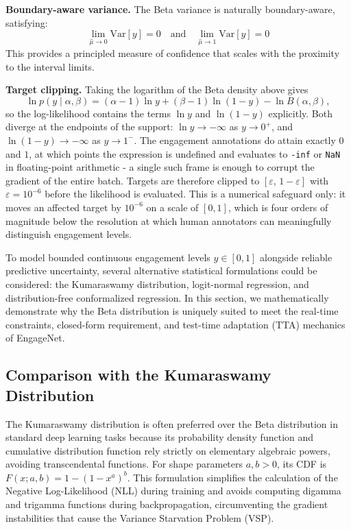 \documentclass[10pt,a4paper,twocolumn]{article}
\begin{document}
	\textbf{Boundary-aware variance.} The Beta variance is naturally boundary-aware, satisfying: 
	$$ \lim_{\hat{\mu} \to 0} \text{Var}[y] = 0 \quad \text{and} \quad \lim_{\hat{\mu} \to 1} \text{Var}[y] = 0 $$
	This provides a principled measure of confidence that scales with the proximity to the interval limits.

	\textbf{Target clipping.} Taking the logarithm of the Beta density above gives $$\ln p(y \mid \alpha,\beta) = (\alpha-1)\ln y + (\beta-1)\ln(1-y) - \ln B(\alpha,\beta),$$ so the log-likelihood contains the terms $\ln y$ and $\ln(1-y)$ explicitly. Both diverge at the endpoints of the support: $\ln y \to -\infty$ as $y \to 0^+$, and $\ln(1-y) \to -\infty$ as $y \to 1^-$. The engagement annotations do attain exactly $0$ and $1$, at which points the expression is undefined and evaluates to \texttt{-inf} or \texttt{NaN} in floating-point arithmetic - a single such frame is enough to corrupt the gradient of the entire batch. Targets are therefore clipped to $[\varepsilon,\, 1-\varepsilon]$ with $\varepsilon = 10^{-6}$ before the likelihood is evaluated. This is a numerical safeguard only: it moves an affected target by $10^{-6}$ on a scale of $[0,1]$, which is four orders of magnitude below the resolution at which human annotators can meaningfully distinguish engagement levels.

		To model bounded continuous engagement levels $y \in [0,1]$ alongside reliable predictive uncertainty, several alternative statistical formulations could be considered: the Kumaraswamy distribution, logit-normal regression, and distribution-free conformalized regression. In this section, we mathematically demonstrate why the Beta distribution is uniquely suited to meet the real-time constraints, closed-form requirement, and test-time adaptation (TTA) mechanics of EngageNet.
	
	\subsection*{Comparison with the Kumaraswamy Distribution}
	The Kumaraswamy distribution \cite{kumaraswamy1980} is often preferred over the Beta distribution in standard deep learning tasks \cite{pumi2020} because its probability density function and cumulative distribution function rely strictly on elementary algebraic powers, avoiding transcendental functions. For shape parameters $a, b > 0$, its CDF is $F(x; a, b) = 1 - (1-x^a)^b$. This formulation simplifies the calculation of the Negative Log-Likelihood (NLL) during training and avoids computing digamma and trigamma functions during backpropagation, circumventing the gradient instabilities that cause the Variance Starvation Problem (VSP).
	
\end{document}
